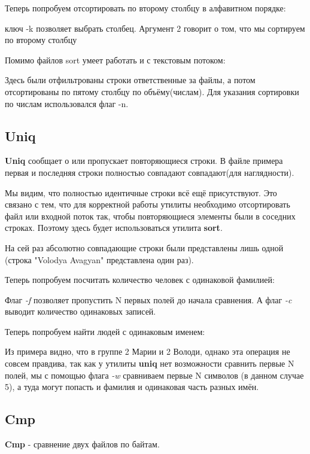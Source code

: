 \documentclass[a4paper]{article}
\begin{document}
Теперь попробуем отсортировать по второму столбцу в алфавитном порядке:

ключ -k позволяет выбрать столбец. Аргумент 2 говорит о том, что мы сортируем по второму столбцу

Помимо файлов sort умеет работать и с текстовым потоком:

Здесь были отфильтрованы строки ответственные за файлы, а потом отсортированы по пятому столбцу по объёму(числам). Для указания сортировки по числам использовался флаг -n.
\subsection{Uniq} 
\textbf{Uniq} сообщает о или пропускает повторяющиеся строки. В файле примера первая и последняя строки полностью совпадают совпадают(для наглядности).



Мы видим, что полностью идентичные строки всё ещё присутствуют. Это связано с тем, что для корректной работы утилиты необходимо отсортировать файл или входной поток так, чтобы повторяющиеся элементы были в соседних строках. Поэтому здесь будет использоваться утилита \textbf{sort}.



На сей раз абсолютно совпадающие строки были представлены лишь одной (строка "Volodya Avagyan" представлена один раз).

Теперь попробуем посчитать количество человек с одинаковой фамилией:



Флаг \textit{-f} позволяет пропустить N первых полей до начала сравнения. А флаг \textit{-c} выводит количество одинаковых записей.

Теперь попробуем найти людей с одинаковым именем:



Из примера видно, что в группе 2 Марии и 2 Володи, однако эта операция не совсем правдива, так как у утилиты \textbf{uniq} нет возможности сравнить первые N полей, мы с помощью флага \textit{-w} сравниваем первые N символов (в данном случае 5), а туда могут попасть и фамилия и одинаковая часть разных имён.
\subsection{Cmp}
\textbf{Cmp} - сравнение двух файлов по байтам.
\end{document}
